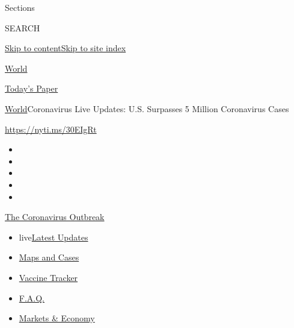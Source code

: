Sections

SEARCH

\protect\hyperlink{site-content}{Skip to
content}\protect\hyperlink{site-index}{Skip to site index}

\href{https://www.nytimes.com/section/world}{World}

\href{https://myaccount.nytimes.com/auth/login?response_type=cookie\&client_id=vi}{}

\href{https://www.nytimes.com/section/todayspaper}{Today's Paper}

\href{/section/world}{World}\textbar{}Coronavirus Live Updates: U.S.
Surpasses 5 Million Coronavirus Cases

\href{https://nyti.ms/30EIgRt}{https://nyti.ms/30EIgRt}

\begin{itemize}
\item
\item
\item
\item
\item
\end{itemize}

\href{https://www.nytimes.com/news-event/coronavirus?action=click\&pgtype=Article\&state=default\&region=TOP_BANNER\&context=storylines_menu}{The
Coronavirus Outbreak}

\begin{itemize}
\tightlist
\item
  live\href{https://www.nytimes.com/2020/08/08/world/coronavirus-updates.html?action=click\&pgtype=Article\&state=default\&region=TOP_BANNER\&context=storylines_menu}{Latest
  Updates}
\item
  \href{https://www.nytimes.com/interactive/2020/us/coronavirus-us-cases.html?action=click\&pgtype=Article\&state=default\&region=TOP_BANNER\&context=storylines_menu}{Maps
  and Cases}
\item
  \href{https://www.nytimes.com/interactive/2020/science/coronavirus-vaccine-tracker.html?action=click\&pgtype=Article\&state=default\&region=TOP_BANNER\&context=storylines_menu}{Vaccine
  Tracker}
\item
  \href{https://www.nytimes.com/interactive/2020/world/coronavirus-tips-advice.html?action=click\&pgtype=Article\&state=default\&region=TOP_BANNER\&context=storylines_menu}{F.A.Q.}
\item
  \href{https://www.nytimes.com/live/2020/08/07/business/stock-market-today-coronavirus?action=click\&pgtype=Article\&state=default\&region=TOP_BANNER\&context=storylines_menu}{Markets
  \& Economy}
\end{itemize}

